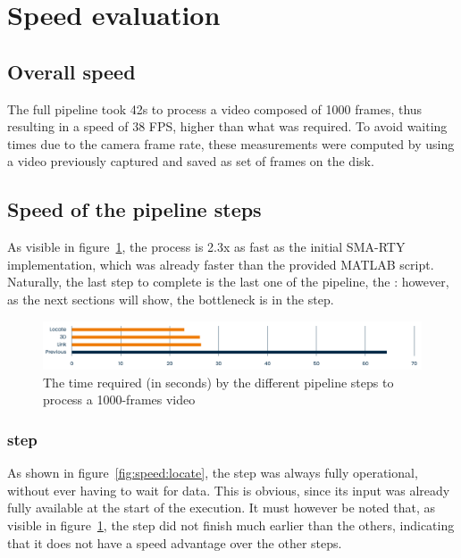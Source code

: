 \section{Speed evaluation}
\label{sec:results:speed}

\subsection{Overall speed}

The full pipeline took 42s to process a video composed of 1000 frames, thus resulting in a speed of 38 FPS, higher than what was required.
To avoid waiting times due to the camera frame rate, these measurements were computed by using a video previously captured and saved as set of frames on the disk.

\subsection{Speed of the pipeline steps}

As visible in figure~\ref{fig:speed:all-pipeline}, the process is 2.3x as fast as the initial SMA-RTY implementation, which was already faster than the provided MATLAB script.
Naturally, the last step to complete is the last one of the pipeline, the \link*: however, as the next sections will show, the bottleneck is in the \locate* step.

\begin{figure}
	\centerline{\includegraphics[width=\textwidth]{images/speed/overall-speed.png}}
	\caption{\centering The time required (in seconds) by the different pipeline steps to process a 1000-frames video}
	\label{fig:speed:all-pipeline}
\end{figure}

\subsubsection{\locate* step}

As shown in figure~\ref{fig:speed:locate}, the \locate* step was always fully operational, without ever having to wait for data.
This is obvious, since its input was already fully available at the start of the execution.
It must however be noted that, as visible in figure~\ref{fig:speed:all-pipeline}, the \locate* step did not finish much earlier than the others, indicating that it does not have a speed advantage over the other steps.

